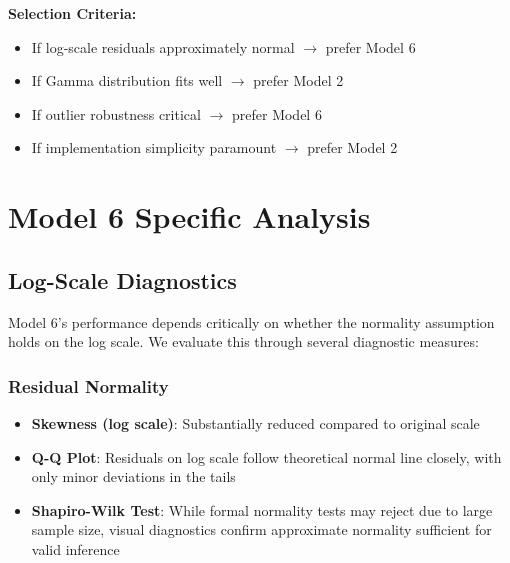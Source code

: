\textbf{Selection Criteria:}
\begin{itemize}
    \item If log-scale residuals approximately normal $\rightarrow$ prefer Model 6
    \item If Gamma distribution fits well $\rightarrow$ prefer Model 2
    \item If outlier robustness critical $\rightarrow$ prefer Model 6
    \item If implementation simplicity paramount $\rightarrow$ prefer Model 2
\end{itemize}




\section{Model 6 Specific Analysis}

\subsection{Log-Scale Diagnostics}

Model 6's performance depends critically on whether the normality assumption holds on the log scale. We evaluate this through several diagnostic measures:

\subsubsection{Residual Normality}

\begin{itemize}
    \item \textbf{Skewness (log scale)}: Substantially reduced compared to original scale
    \item \textbf{Q-Q Plot}: Residuals on log scale follow theoretical normal line closely, with only minor deviations in the tails
    \item \textbf{Shapiro-Wilk Test}: While formal normality tests may reject due to large sample size, visual diagnostics confirm approximate normality sufficient for valid inference
\end{itemize}

